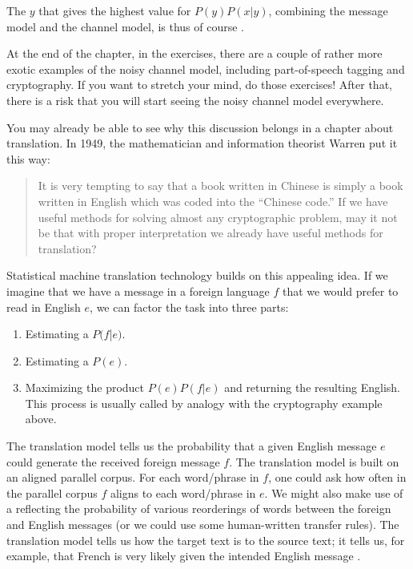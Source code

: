 The $y$ that gives the highest value for  $P(y) P(x | y)$, combining the message model and the channel model, is thus of course .


At the end of the chapter, in the exercises, there are a couple of rather more exotic examples of
the noisy channel model, including part-of-speech tagging and cryptography. If you want to stretch your mind, do those exercises!
After that, there is a risk that you will start seeing the noisy channel model everywhere.

You may already be able to see why this discussion belongs in a chapter about translation. In 1949, the mathematician and information theorist Warren \citet{Weaver:1949} put it this way:

\begin{quote}
  It is very tempting to say that a book written in Chinese is simply
  a book written in English which was coded into the ``Chinese code.''
  If we have useful methods for solving almost any cryptographic
  problem, may it not be that with proper interpretation we already
  have useful methods for translation? \citep[22]{Weaver:1949}
\end{quote}

Statistical machine translation technology builds on this appealing
idea.  If we imagine that we have a
message in a foreign language  \(f\) that we would prefer to read in English
\(e\), we can factor the task into three parts:

\begin{enumerate} 
	\item Estimating a  $P(f$|$e)$.
	\item Estimating a   $P(e)$.
	\item Maximizing the product $P(e) P(f|e)$ and returning the resulting English. This process is usually called  by analogy with the cryptography example above.
\end{enumerate}



The translation model tells us the probability that a given English message $e$ could generate the received foreign message $f$.  The translation model is built on an aligned parallel corpus.  For each word/phrase in $f$, one could ask how often in the parallel corpus $f$ aligns to each word/phrase in $e$. We might also make use of a  reflecting the probability of various reorderings of words between the foreign and English messages (or we could use some human-written transfer rules).  The translation model tells us how  the target text is to the source text; it tells us, for example, that French  is  very likely  given the intended English message .


